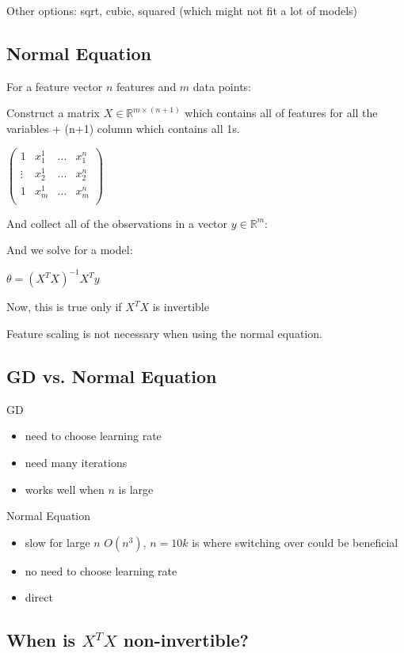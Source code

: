 Other options: sqrt, cubic, squared (which might not fit a lot of models)

\subsection{Normal Equation}

For a feature vector $n$ features and $m$ data points: 

Construct a matrix $X  \in \mathbb{R}^{m\times (n+1)}$ which contains all of features for all the variables + (n+1) column which contains all 1s.

$\left( \begin{matrix} 1 & x_1^1 & ... & x_1^n \\ \vdots & x_2^1 & ... & x_2^n \\   1 & x_m^1 & ... & x_m^n \\ \end{matrix} \right)$

And collect all of the observations in a vector $y \in \mathbb{R}^m $:

And we solve for a model:

$\theta = (X^T X)^{-1} X^T y$

Now, this is true only if $X^T X$ is invertible

Feature scaling is not necessary when using the normal equation.

\subsection{GD vs. Normal Equation}

GD
\begin{itemize}
\item need to choose learning rate
\item need many iterations
\item works well when $n$ is large
\end{itemize}

Normal Equation 
\begin{itemize}
\item slow for large $n$  $O(n^3)$, $n=10k$ is where switching over could be beneficial
\item no need to choose learning rate
\item direct
\end{itemize}

\subsection{When is $X^TX$ non-invertible?}

